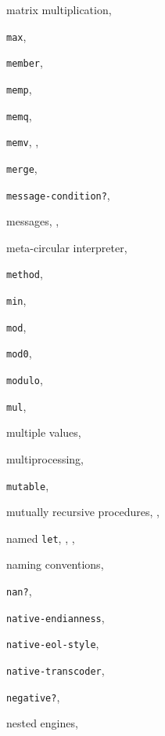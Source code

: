 {\begin{multicols}{2}
matrix multiplication, \pageref{examples_s1}
  
\texttt{max}, \textit{\pageref{objects_s107}}
  
\texttt{member}, \textit{\pageref{objects_s51}}
  
\texttt{memp}, \textit{\pageref{objects_s52}}
  
\texttt{memq}, \textit{\pageref{objects_s51}}
  
\texttt{memv}, \pageref{start_s141}, \textit{\pageref{objects_s51}}
  
\texttt{merge}, \pageref{examples_s11}
  
\texttt{message-condition?}, \textit{\pageref{exceptions_s24}}
  
messages, \pageref{start_s177}, \pageref{examples_s62}
  
meta-circular interpreter, \pageref{examples_s47}
  
\texttt{method}, \pageref{syntax_s67}
  
\texttt{min}, \textit{\pageref{objects_s108}}
  
\texttt{mod}, \textit{\pageref{objects_s99}}
  
\texttt{mod0}, \textit{\pageref{objects_s100}}
  
\texttt{modulo}, \textit{\pageref{objects_s98}}
  
\texttt{mul}, \pageref{examples_s2}
  
multiple values, \pageref{intro_s54}
  
multiprocessing, \pageref{examples_s84}
  
\texttt{mutable}, \textit{\pageref{records_s16}}
  
mutually recursive procedures, \pageref{further_s36}, \pageref{binding_s21}
  
named \texttt{let}, \pageref{further_s41}, \pageref{further_s50}, \pageref{control_s21}
  
naming conventions, \pageref{intro_s45}
  
\texttt{nan?}, \textit{\pageref{objects_s97}}
  
\texttt{native-endianness}, \textit{\pageref{objects_s241}}
  
\texttt{native-eol-style}, \textit{\pageref{io_s24}}
  
\texttt{native-transcoder}, \textit{\pageref{io_s21}}
  
\texttt{negative?}, \textit{\pageref{objects_s95}}
  
nested engines, \pageref{examples_s109}
  

\end{multicols}}
